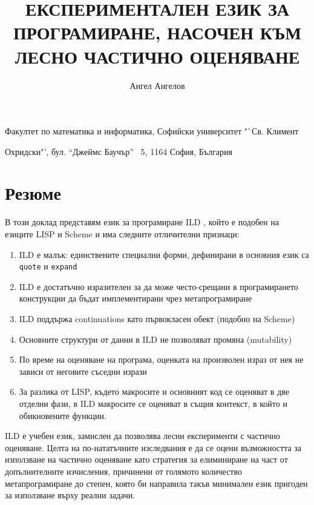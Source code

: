 \documentclass[11pt,a4paper]{amsart}
\title{\MakeUppercase{експериментален език за програмиране, насочен към лесно частично оценяване}}
\author[angel]{Ангел Ангелов}
\theoremstyle{definition}
\begin{document}
\newcommand\FMI{Факултет по математика и информатика,
Софийски университет "`Св. Климент\par Охридски"',
бул. "`Джеймс Баучър"' \No~5, 1164 София, България}

\newcommand\NSF{Фонд "`Научни изследвания"' при МОН\xspace}

\newcommand\SUF{Фонд "`Научни изследвания"' при СУ "`Св. Климент Охридски"'\xspace}

\renewcommand\emailaddrname{{\itshape E-mail}}

\newcommand\lang{ILD }

\maketitle
\begin{center}
\FMI
\end{center}

\thispagestyle{empty}

\bigskip

\section*{Резюме%
}

\bigskip

В този доклад представям език за програмиране \lang, който е подобен на
езиците LISP и Scheme и има следните отличителни признаци:

\begin{enumerate}
    \item \lang е малък: единствените специални форми, дефинирани в основния
    език са \texttt{quote} и \texttt{expand}
    \item \lang е достатъчно изразителен за да може често-срещани в програмирането
    конструкции да бъдат имплементирани чрез метапрограмиране
    \item \lang поддържа continuations като първокласен обект (подобно на Scheme)
    \item\label{immutable} Основните структури от данни в \lang не позволяват промяна (mutability)
    \item\label{isolatedsiblings} По време на оценяване на програма, оценката на произволен
    израз от нея не зависи от неговите съседни изрази
    \item\label{runtimemacros} За разлика от LISP, където макросите и основният код
    се оценяват в две отделни фази, в \lang макросите се оценяват в същия контекст,
    в който и обикновените функции.
\end{enumerate}

\lang е учебен език, замислен да позволява лесни експерименти с частично оценяване.
Целта на по-нататъчните изследвания е да се оцени възможността за използване
на частично оценяване като стратегия за елиминиране на част от допълнителните изчисления,
причинени от голямото количество метапрограмиране до степен, която би направила
такъв минимален език пригоден за използване върху реални задачи.

\bigskip
\end{document}
